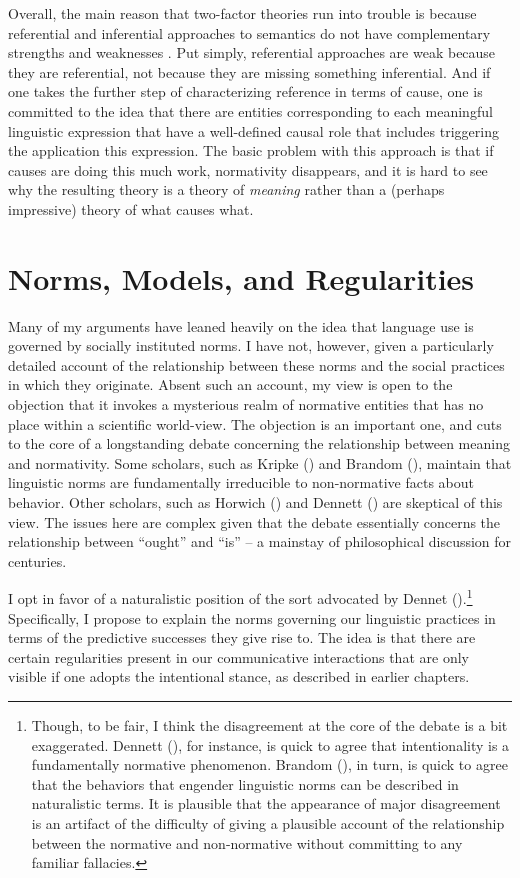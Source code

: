Overall, the main reason that two-factor theories run into trouble is because referential and inferential approaches to semantics do not have complementary strengths and weaknesses \citep[c.f.,][]{Eliasmith:2000}. Put simply, referential approaches are weak because they are referential, not because they are missing something inferential. And if one takes the further step of characterizing reference in terms of cause, one is committed to the idea that there are entities corresponding to each meaningful linguistic expression that have a well-defined causal role that includes triggering the application this expression. The basic problem with this approach is that if causes are doing this much work, normativity disappears, and it is hard to see why the resulting theory is a theory of \textit{meaning} rather than a (perhaps impressive) theory of what causes what.

\section{Norms, Models, and Regularities}

Many of my arguments have leaned heavily on the idea that language use is governed by socially instituted norms. I have not, however, given a particularly detailed account of the relationship between these norms and the social practices in which they originate. Absent such an account, my view is open to the objection that it invokes a mysterious realm of normative entities that has no place within a scientific world-view. The objection is an important one, and cuts to the core of a longstanding debate concerning the relationship between meaning and normativity. Some scholars, such as Kripke (\citeyear{Kripke:1982}) and Brandom (\citeyear{Brandom:1994}), maintain that linguistic norms are fundamentally irreducible to non-normative facts about behavior. Other scholars, such as Horwich (\citeyear{Horwich:2005}) and Dennett (\citeyear{Dennett:2010,Dennett:1987}) are skeptical of this view. The issues here are complex given that the debate essentially concerns the relationship between ``ought'' and ``is'' -- a mainstay of philosophical discussion for centuries. 

I opt in favor of a naturalistic position of the sort advocated by Dennet (\citeyear{Dennett:2010,Dennett:1991,Dennett:1987}).\footnote{Though, to be fair, I think the disagreement at the core of the debate is a bit exaggerated. Dennett (\citeyear{Dennett:2010,Dennett:1987}), for instance, is quick to agree that intentionality is a fundamentally normative phenomenon. Brandom (\citeyear{Brandom:1994,Brandom:2010b}), in turn, is quick to agree that the behaviors that engender linguistic norms can be described in naturalistic terms. It is plausible that the appearance of major disagreement is an artifact of the difficulty of giving a plausible account of the relationship between the normative and non-normative without committing to any familiar fallacies.} Specifically, I propose to explain the norms governing our linguistic practices in terms of the predictive successes they give rise to. The idea is that there are certain regularities present in our communicative interactions that are only visible if one adopts the intentional stance, as described in earlier chapters. 

